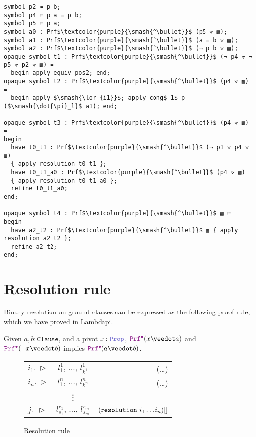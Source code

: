 \begin{lstlisting}[mathescape=true, caption={Trace from \cref{lst:smtexampleinput} encoded in Lambdapi.}, label={lst:smtexamplelambdapi}, language=Lambdapi]
symbol p2 ≔ p b;
symbol p4 ≔ p a = p b;
symbol p5 ≔ p a;
symbol a0 : Prf$\textcolor{purple}{\smash{^\bullet}}$ (p5 ⟇ ▩);
symbol a1 : Prf$\textcolor{purple}{\smash{^\bullet}}$ (a = b ⟇ ▩);
symbol a2 : Prf$\textcolor{purple}{\smash{^\bullet}}$ (¬ p b ⟇ ▩);
opaque symbol t1 : Prf$\textcolor{purple}{\smash{^\bullet}}$ (¬ p4 ⟇ ¬ p5 ⟇ p2 ⟇ ▩) ≔
  begin apply equiv_pos2; end;
opaque symbol t2 : Prf$\textcolor{purple}{\smash{^\bullet}}$ (p4 ⟇ ▩) ≔
  begin apply $\smash{\lor_{i1}}$; apply cong$_1$ p ($\smash{\dot{\pi}_l}$ a1); end;

opaque symbol t3 : Prf$\textcolor{purple}{\smash{^\bullet}}$ (p4 ⟇ ▩) ≔
begin
  have t0_t1 : Prf$\textcolor{purple}{\smash{^\bullet}}$ (¬ p1 ⟇ p4 ⟇ ▩)
  { apply resolution t0 t1 };
  have t0_t1_a0 : Prf$\textcolor{purple}{\smash{^\bullet}}$ (p4 ⟇ ▩)
  { apply resolution t0_t1 a0 };
  refine t0_t1_a0;
end;

opaque symbol t4 : Prf$\textcolor{purple}{\smash{^\bullet}}$ ▩ ≔
begin
  have a2_t2 : Prf$\textcolor{purple}{\smash{^\bullet}}$ ▩ { apply resolution a2 t2 };
  refine a2_t2;
end;
\end{lstlisting}


\section{Resolution rule}
\label{ssec:resolution}


Binary resolution on ground clauses can be expressed as the following proof rule, which we have proved in Lambdapi.

\begin{lemma}[Resolution]\label{lemma:resolution}
Given $a,b: \texttt{Clause}$, and a pivot $x: \prop$, $\pid (x \veedot a)$ and $\pid (\neg x \veedot b)$ implies $\pid (a \veedot b)$.
\end{lemma}

\begin{figure}[]
  \centering
  \begin{tabular}{l c r}
  $i_1.~\triangleright$  & \qquad $l_1^1,\, \dots,\, l_{k^1}^1$ \qquad & (\dots)  \\
  $i_n.~\triangleright$  & \qquad $l_1^n,\, \dots,\, l_{k^n}^n$ \qquad & (\dots) \\
    & \vdots  &  \\
  $j.~~\triangleright$  & \qquad $l_{s_1}^{r_1},\, \dots,\, l_{s_m}^{r_m}$ \qquad & $(\texttt{\upshape{resolution}}~i_1 \dots i_n)[]$
  \end{tabular}
  \caption{Resolution rule}
  \label{fig:resolution-rule}
\end{figure}


